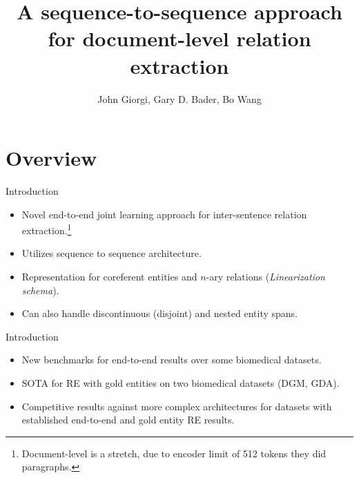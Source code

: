 \documentclass[usenames,dvipsnames,pdf]{beamer}
\title{A sequence-to-sequence approach for document-level relation extraction}
\author{John Giorgi, Gary D. Bader, Bo Wang}
\begin{document}
	\begin{frame}
		\titlepage
	\end{frame}


        \section{Overview}

        \begin{frame}{Introduction}
          \begin{itemize}
          \item
            Novel end-to-end joint learning approach for inter-sentence relation extraction.\footnote{Document-level is a stretch, due to encoder limit of 512 tokens they did paragraphs.}
          \item
            Utilizes sequence to sequence architecture.
          \item
            Representation for coreferent entities and $n$-ary relations (\textit{Linearization schema}).
          \item
            Can also handle discontinuous (disjoint) and nested entity spans.  
          \end{itemize}
        \end{frame}

        \begin{frame}{Introduction}
          \begin{itemize}
          \item
            New benchmarks for end-to-end results over some biomedical datasets.
          \item
            SOTA for RE with gold entities on two biomedical datasets (DGM, GDA).
          \item
            Competitive results against more complex architectures for datasets
            with established end-to-end and gold entity RE results.
          \end{itemize}
          
        \end{frame}
\end{document}
